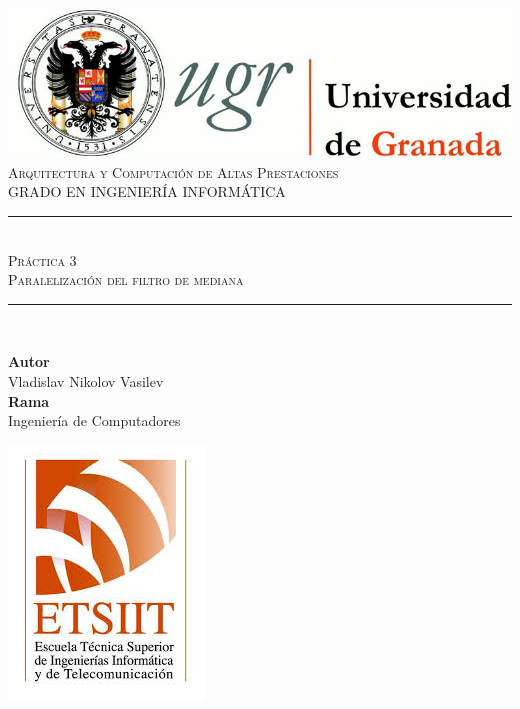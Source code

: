 \documentclass[11pt,a4paper]{article}
\newcommand{\asignatura}{Arquitectura y Computación de Altas Prestaciones}
\newcommand{\autor}{Vladislav Nikolov Vasilev}
\newcommand{\titulo}{Práctica 3}
\newcommand{\subtitulo}{Paralelización del filtro de mediana}
\newcommand{\rama}{Ingeniería de Computadores}
\begin{document}

\begin{titlepage}

\begin{minipage}{\textwidth}

\centering

\includegraphics[scale=0.3]{img/logo_ugr.jpg}\\[1cm]

\textsc{\Large \asignatura{}\\[0.2cm]}
\textsc{GRADO EN INGENIERÍA INFORMÁTICA}\\[1cm]

\noindent\rule[-1ex]{\textwidth}{1pt}\\[1.5ex]
\textsc{{\Huge \titulo\\[0.5ex]}}
\textsc{{\Large \subtitulo\\}}
\noindent\rule[-1ex]{\textwidth}{2pt}\\[3.5ex]

\end{minipage}

\vspace{0.7cm}

\begin{minipage}{\textwidth}

\centering

\textbf{Autor}\\ {\autor{}}\\[2.5ex]
\textbf{Rama}\\ {\rama}\\[2.5ex]
\vspace{0.3cm}

\includegraphics[scale=0.3]{img/etsiit.jpeg}


\end{minipage}
\end{titlepage}
\end{document}
